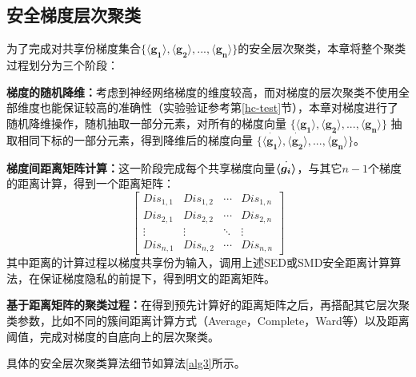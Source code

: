 \subsection{安全梯度层次聚类}
为了完成对共享份梯度集合$\{\boldsymbol{\langle g_1\rangle}, \boldsymbol{\langle g_2\rangle},...,\boldsymbol{\langle g_n\rangle} \}$的安全层次聚类，本章将整个聚类过程划分为三个阶段：
\begin{compactenum}
	\item \textbf{梯度的随机降维：}考虑到神经网络梯度的维度较高，而对梯度的层次聚类不使用全部维度也能保证较高的准确性（实验验证参考第\ref{hc-test}节），本章对梯度进行了随机降维操作，随机抽取一部分元素，对所有的梯度向量 $\{\boldsymbol{\langle g_1\rangle}, \boldsymbol{\langle g_2\rangle},...,\boldsymbol{\langle g_n\rangle} \}$ 抽取相同下标的一部分元素，得到降维后的梯度向量 $\{\dot{\boldsymbol{\langle g_1\rangle}}, \dot{\boldsymbol{\langle g_2\rangle}},...,\dot{\boldsymbol{\langle g_n\rangle}} \}$。
	\item \textbf{梯度间距离矩阵计算：}这一阶段完成每个共享梯度向量$\dot{\boldsymbol{\langle g_i\rangle_{}}}$，与其它$n-1$个梯度的距离计算，得到一个距离矩阵：
	\[
	\begin{bmatrix}
		\textit{Dis}_{1,1} & \textit{Dis}_{1,2} & \cdots & \textit{Dis}_{1,n} \\
		\textit{Dis}_{2,1} & \textit{Dis}_{2,2} & \cdots & \textit{Dis}_{2,n} \\
		\vdots & \vdots & \ddots & \vdots \\
		\textit{Dis}_{n,1} & \textit{Dis}_{n,2} & \cdots & \textit{Dis}_{n,n}
	\end{bmatrix}
	\]
	其中距离的计算过程以梯度共享份为输入，调用上述SED或SMD安全距离计算算法，在保证梯度隐私的前提下，得到明文的距离矩阵。
	\item \textbf{基于距离矩阵的聚类过程：}在得到预先计算好的距离矩阵之后，再搭配其它层次聚类参数，比如不同的簇间距离计算方式（Average，Complete，Ward等）以及距离阈值，完成对梯度的自底向上的层次聚类。
\end{compactenum}
具体的安全层次聚类算法细节如算法\ref{alg3}所示。

